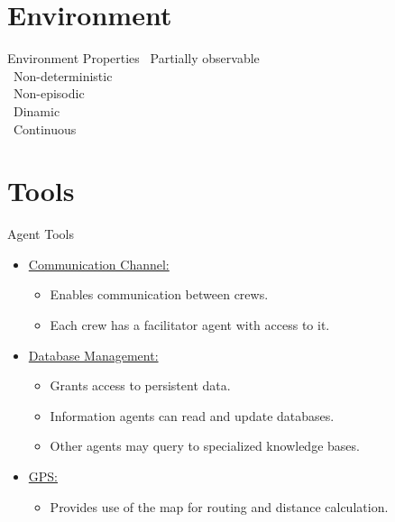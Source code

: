 \documentclass{beamer}
\begin{document}
\section{Environment}
\begin{frame}{Environment Properties}
            \vspace{0.5em}
         \hspace{3em}       \faEye\ Partially observable\\
\vspace{0.5em}
         \hspace{3em}       \faQuestionCircle\ Non-deterministic\\
\vspace{0.5em}
          \hspace{3em}     \faLink\ Non-episodic\\
\vspace{0.5em}
         \hspace{3em}    \faRefresh\ Dinamic\\
\vspace{0.5em}
       \hspace{3em}          \faMapMarker\ Continuous\\
\vspace{0.5em}
\end{frame}

\section{Tools}
\begin{frame}{Agent Tools}
    \begin{itemize}
        \item \underline{Communication Channel:}
        \begin{itemize}
            \item Enables \alert{communication} between crews.
            \item Each crew has a \alert{facilitator} agent with access to it.
        \end{itemize}
        \item \underline{Database Management:}
        \begin{itemize}
            \item Grants access to \alert{persistent} data.
            \item \alert{Information} agents can read and update databases.
            \item Other agents may query to \alert{specialized knowledge} bases.
        \end{itemize}
        \item \underline{GPS:}
        \begin{itemize}
            \item Provides use of the map for \alert{routing} and \alert{distance calculation}.
        \end{itemize}
    \end{itemize}
\end{frame}
\end{document}

